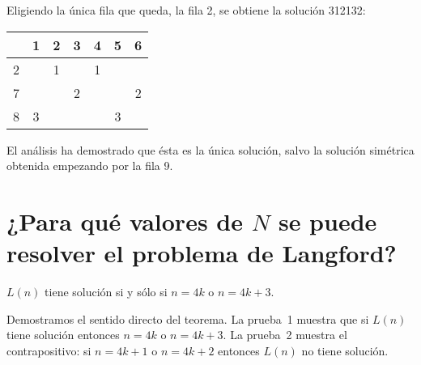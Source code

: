 Eligiendo la única fila que queda, la fila 2, se obtiene la solución 3{}1{}2{}1{}3{}2:
\begin{center}
\addtolength{\tabcolsep}{4pt}
\begin{tabular}{|c||c|c|c|c|c|c|}
\hline
&1&2&3&4&5&6\\\hline\hline
2&&1&&1&&\\\hline
7&&&2&&&2\\\hline
8&3&&&&3&\\\hline
\end{tabular}
\end{center}
El análisis ha demostrado que ésta es la única solución, salvo la solución simétrica obtenida empezando por la fila 9.

\section{¿Para qué valores de $N$ se puede resolver el problema de Langford?}\label{s.langford-theorem}

\begin{theorem} \label{thm.langford}
$L(n)$ tiene solución si y sólo si $n=4k$ o $n=4k+3$.
\end{theorem}

Demostramos el sentido directo del teorema. La prueba~1 muestra que si $L(n)$ tiene solución entonces $n=4k$ o $n=4k+3$. La prueba~2 muestra el contrapositivo: si $n=4k+1$ o $n=4k+2$ entonces $L(n)$ no tiene solución.

